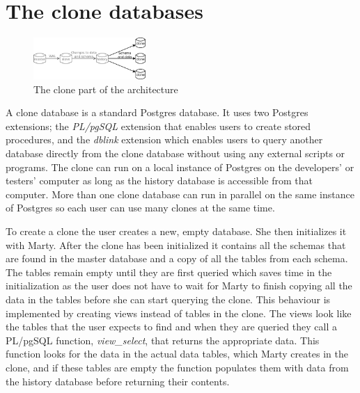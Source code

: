 \section{The clone databases}
\label{ch:architecture-clone-databases}

\begin{figure}
  \vspace{-20pt}
  \begin{center}
    \includegraphics[width=0.38\textwidth]{img/architecture-clones}
  \end{center}
  \vspace{-20pt}
  \caption{The clone part of the architecture}
  \vspace{-10pt}
\end{figure}

A clone database is a standard Postgres database.
It uses two Postgres extensions; the \textit{PL/pgSQL} extension that enables users to create stored procedures, and the \textit{dblink} extension which enables users to query another database directly from the clone database without using any external scripts or programs.
The clone can run on a local instance of Postgres on the developers' or testers' computer as long as the history database is accessible from that computer.
More than one clone database can run in parallel on the same instance of Postgres so each user can use many clones at the same time.

To create a clone the user creates a new, empty database.
She then initializes it with Marty.
After the clone has been initialized it contains all the schemas that are found in the master database and a copy of all the tables from each schema.
The tables remain empty until they are first queried which saves time in the initialization as the user does not have to wait for Marty to finish copying all the data in the tables before she can start querying the clone.
This behaviour is implemented by creating views instead of tables in the clone.
The views look like the tables that the user expects to find and when they are queried they call a PL/pgSQL function, \textit{view\_select}, that returns the appropriate data.
This function looks for the data in the actual data tables, which Marty creates in the clone, and if these tables are empty the function populates them with data from the history database before returning their contents.

